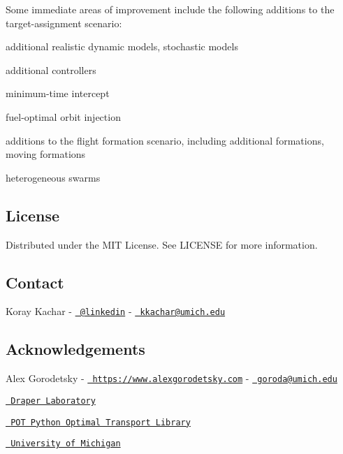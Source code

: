 Some immediate areas of improvement include the following additions to the target-\/assignment scenario\+:
\begin{DoxyItemize}
\item additional realistic dynamic models, stochastic models
\item additional controllers
\begin{DoxyItemize}
\item minimum-\/time intercept
\item fuel-\/optimal orbit injection
\end{DoxyItemize}
\item additions to the flight formation scenario, including additional formations, moving formations
\item heterogeneous swarms
\end{DoxyItemize}

\subsection*{License}

Distributed under the M\+IT License. See {\ttfamily L\+I\+C\+E\+N\+SE} for more information.

\subsection*{Contact}


\begin{DoxyItemize}
\item Koray Kachar -\/ \href{https://www.linkedin.com/in/koray-kachar/}{\texttt{ @linkedin}} -\/ \href{mailto:kkachar@umich.edu}{\texttt{ kkachar@umich.\+edu}}
\end{DoxyItemize}

\subsection*{Acknowledgements}


\begin{DoxyItemize}
\item Alex Gorodetsky -\/ \href{https://www.alexgorodetsky.com}{\texttt{ https\+://www.\+alexgorodetsky.\+com}} -\/ \href{mailto:goroda@umich.edu}{\texttt{ goroda@umich.\+edu}}
\item \href{https://www.draper.com}{\texttt{ Draper Laboratory}}
\item \href{https://github.com/rflamary/POT}{\texttt{ P\+OT Python Optimal Transport Library}}
\item \href{https://aero.engin.umich.edu}{\texttt{ University of Michigan}} 
\end{DoxyItemize}